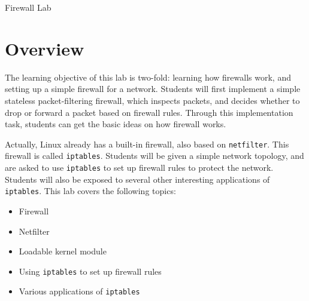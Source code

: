 



\newcommand{\telnet} {\texttt{telnet}\xspace}
\newcommand{\iptables}{\texttt{iptables}\xspace}
\newcommand{\netfilter}{\texttt{netfilter}\xspace}
\newcommand{\Netfilter}{\texttt{Netfilter}\xspace}

\newcommand{\firewallFigs}{./Figs}





\begin{center}
{\LARGE Firewall Lab}
\end{center}




\section{Overview}

The learning objective of this lab is two-fold: learning
how firewalls work, and setting up a simple firewall
for a network. Students will first 
implement a simple stateless packet-filtering firewall, 
which inspects packets, and decides 
whether to drop or forward a packet based on firewall rules. 
Through this implementation task, students can get the 
basic ideas on how firewall works.


Actually, Linux already has a built-in firewall, also based on 
\texttt{netfilter}. This firewall is called \iptables. 
Students will be given a simple network topology, and are asked to
use \iptables to set up firewall rules to protect the network. 
Students will also be exposed to several other interesting 
applications of \iptables. 
This lab covers the following topics:


\begin{itemize}[noitemsep]
\item Firewall
\item Netfilter
\item Loadable kernel module
\item Using \iptables to set up firewall rules
\item Various applications of \iptables
\end{itemize}


